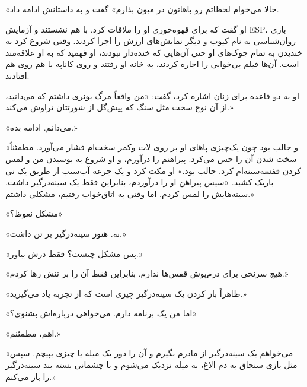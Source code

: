 {«حالا می‌خوام لحظاتم رو باهاتون در میون بذارم» گفت و به داستانش ادامه داد.

او گفت که برای قهوه‌خوری او را ملاقات کرد. با هم نشستند و آزمایش ESP، بازی روان‌شناسی به نام کیوب و دیگر نمایش‌های ارزش را اجرا کردند. وقتی شروع کرد به خندیدن به تمام جوک‌های او حتی آن‌هایی که خنده‌دار نبودند، او فهمید که به او علاقه‌مند است. آن‌ها فیلم بی‌خوابی را اجاره کردند، به خانه او رفتند و روی کاناپه با هم روی هم افتادند.

او به دو قاعده برای زنان اشاره کرد، گفت: «من واقعاً مرگ بونری داشتم که می‌دانید، از آن نوع سخت مثل سنگ که پیش‌گل از شورتتان تراوش می‌کند.»

«می‌دانم. ادامه بده.»

«و جالب بود چون یک‌چیزی پاهای او بر روی لات و‌کمر سخت‌ام فشار می‌آورد. مطمئناً سخت شدن آن را حس می‌کرد. پیراهنم را درآورم، و او شروع به بوسیدن من و لمس کردن قفسه‌سینه‌ام کرد. جالب بود.» او مکث کرد و یک جرعه آب‌سیب از طریق یک نی باریک کشید. «سپس پیراهن او را درآوردم، بنابراین فقط یک سینه‌درگیر داشت. سینه‌هایش را لمس کردم. اما وقتی به اتاق‌خواب رفتیم، مشکلی داشتم.»

«مشکل نعوظ؟»

«نه. هنوز سینه‌درگیر بر تن داشت.»

«پس مشکل چیست؟ فقط درش بیاور.»

«هیچ سرنخی برای د‌رم‌پوش قفس‌ها ندارم. بنابراین فقط آن را بر تنش رها کردم.»

«ظاهراً باز کردن یک سینه‌درگیر چیزی است که از تجربه یاد می‌گیرید.»

«اما من یک برنامه دارم. می‌خواهی درباره‌اش بشنوی؟»

«اهم، مطمئنم.»

«می‌خواهم یک سینه‌درگیر از مادرم بگیرم و آن را دور یک میله یا چیزی بپیچم. سپس مثل بازی سنجاق به دم الاغ، به میله نزدیک می‌شوم و با چشمانی بسته بند سینه‌درگیر را باز می‌کنم.»}